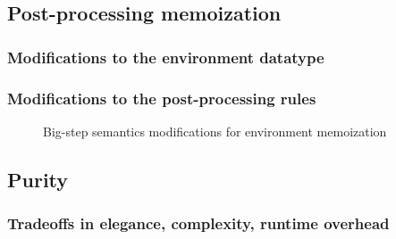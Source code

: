 
\subsection{Post-processing memoization}
\label{sec:memoization}

\subsubsection{Modifications to the environment datatype}
\label{sec:memoization-evalenv}

\subsubsection{Modifications to the post-processing rules}
\label{sec:memoization-postprocessing}

\begin{figure}
  \centering
  \begin{mdframed}
    \begin{singlespace}
      
    \end{singlespace}
  \end{mdframed}
  \caption{Big-step semantics modifications for environment memoization}
  \label{fig:big-step-memoization-rules}
\end{figure}

\subsection{Purity}
\label{sec:env-purity}


\subsubsection{Tradeoffs in elegance, complexity, runtime overhead}
\label{sec:elegance-and-complexity}


